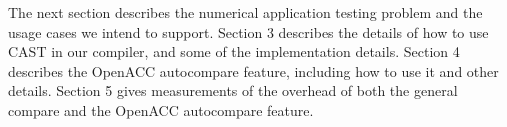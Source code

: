 The next section describes the numerical application testing problem and the usage cases we intend to support.
Section 3 describes the details of how to use CAST in our compiler, and some of the implementation details.
Section 4 describes the OpenACC autocompare feature, including how to use it and other details.
Section 5 gives measurements of the overhead of both the general compare and the OpenACC autocompare feature.

